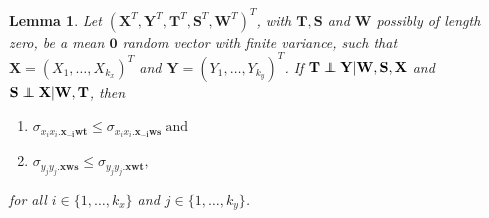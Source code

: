 \documentclass[11pt,a4paper]{article}
\newtheorem{Lemma}[Satz]{Lemma}
\theoremstyle{definition}
\theoremstyle{remark}
\newcommand\ci{\protect\mathpalette{\protect\independenT}{\perp}}
\def\independenT#1#2{\mathrel{\rlap{$#1#2$}\mkern2mu{#1#2}}}
\begin{document}
\begin{Lemma}
	Let $(\mathbf{X}^T,\mathbf{Y}^T,\mathbf{T}^T,\mathbf{S}^T, \mathbf{W}^T)^T$, with $\mathbf{T}, \mathbf{S}$ and $\mathbf{W}$ possibly of length zero, be
	 a mean $\mathbf{0}$ random vector with finite variance, such that $\mathbf{X}=(X_1,\dots,X_{k_x})^T$ and $\mathbf{Y} = (Y_1,\dots,Y_{k_y})^T$. If $\mathbf{T} \ci \mathbf{Y} | \mathbf{W},\mathbf{S},\mathbf{X}$ and $\mathbf{S} \ci \mathbf{X} | \mathbf{W},\mathbf{T}$, 
	then
	\begin{enumerate}[ label = (\alph*)]
		\item $\sigma_{x_ix_i.\mathbf{x_{-i}wt}} \leq \sigma_{x_ix_i.\mathbf{x_{-i}ws}} \ \textrm{and}$
		\label{x-variance1}
		\item $\sigma_{y_jy_j.\mathbf{xws}} \leq \sigma_{y_jy_j.\mathbf{xwt}},$
		\label{y-variance1}
	\end{enumerate}
for all $i \in \{1,\dots,k_x\}$ and $j \in \{1,\dots, k_y\}$.
	\label{close}
\end{Lemma}
\end{document}
